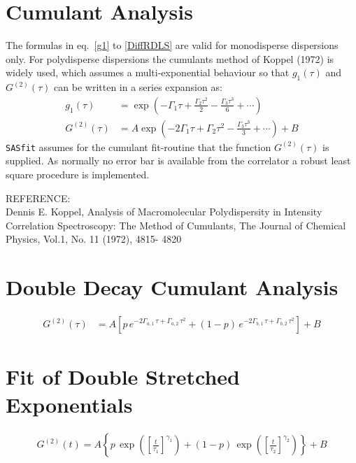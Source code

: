 \section{Cumulant Analysis}
The formulas in eq.\ \ref{g1} to \ref{DiffRDLS} are valid for monodisperse
dispersions only. For polydisperse dispersions the cumulants method of Koppel (1972) is widely used,
which assumes a multi-exponential behaviour so that $g_1(\tau)$ and $G^{(2)}(\tau)$
can be written in a series expansion as:
\begin{align}
 g_1(\tau)  &= \exp\left(-\Gamma_1 \tau + \frac{\Gamma_2 \tau^2}{2} - \frac{\Gamma_3 \tau^3}{6} + \cdots \right)\\
 G^{(2)}(\tau) &=  A \exp\left(- 2\Gamma_1 \tau + \Gamma_2 \tau^2 - \frac{\Gamma_3 \tau^3}{3} + \cdots \right) + B
\label{G2Cumulant}
\end{align}
\texttt{SASfit} assumes for the cumulant fit-routine that the function $G^{(2)}(\tau)$ is supplied. As normally no error
bar is available from the correlator a robust least square procedure is implemented.

\vspace{5mm}
\noindent REFERENCE:\\
Dennis E. Koppel, Analysis of Macromolecular Polydispersity in
Intensity Correlation Spectroscopy: The Method of Cumulants, The
Journal of Chemical Physics, Vol.1, No. 11 (1972), 4815- 4820

\newpage
\section{Double Decay Cumulant Analysis}
\begin{align}
G^{(2)}(\tau) &=  A \left[p \, e^{- 2\Gamma_{a,1}\, \tau + \Gamma_{a,2}\, \tau^2}
                     +(1-p) \, e^{- 2\Gamma_{b,1}\, \tau + \Gamma_{b,2}\, \tau^2}\right] + B
\label{G2DoubleCumulantDecay}
\end{align}

\newpage
\section{Fit of Double Stretched Exponentials}
\begin{align}
G^{(2)}(t) = A \left\{p \, \exp\left(\left[\frac{t}{\tau_1}\right]^{\gamma_1}\right)
+ (1-p) \, \exp\left(\left[\frac{t}{\tau_2}\right]^{\gamma_2}\right)
\right\} + B \label{G2DoubleExpDecay}
\end{align}


\newpage
